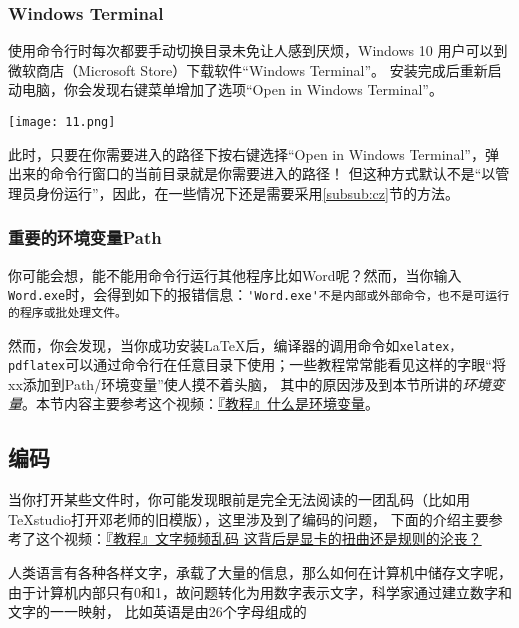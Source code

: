 \subsubsection{Windows Terminal}


使用命令行时每次都要手动切换目录未免让人感到厌烦，Windows 10 用户可以到微软商店（Microsoft Store）下载软件“Windows Terminal”。
安装完成后重新启动电脑，你会发现右键菜单增加了选项“Open in Windows Terminal”。

\begin{center}
  \texttt{[image: 11.png]}
\end{center}
此时，只要在你需要进入的路径下按右键选择“Open in Windows Terminal”，弹出来的命令行窗口的当前目录就是你需要进入的路径！
但这种方式默认不是“以管理员身份运行”，因此，在一些情况下还是需要采用\ref{subsub:cz}节的方法。



\subsubsection{重要的环境变量Path}


你可能会想，能不能用命令行运行其他程序比如Word呢？然而，当你输入\verb"Word.exe"时，会得到如下的报错信息：\verb"'Word.exe'不是内部或外部命令，也不是可运行的程序或批处理文件。"

然而，你会发现，当你成功安装\LaTeX{}后，编译器的调用命令如\verb"xelatex，pdflatex"可以通过命令行在任意目录下使用；一些教程常常能看见这样的字眼“将xx添加到Path/环境变量”使人摸不着头脑，
其中的原因涉及到本节所讲的\emph{环境变量}。本节内容主要参考这个视频：\href{https://www.bilibili.com/video/BV1w741147G9?from=search&seid=9151606959931684460&spm_id_from=333.337.0.0}{『教程』什么是环境变量}。



\subsection{编码}


当你打开某些文件时，你可能发现眼前是完全无法阅读的一团乱码（比如用TeXstudio打开邓老师的旧模版），这里涉及到了编码的问题，
下面的介绍主要参考了这个视频：\href{https://www.bilibili.com/video/BV1ai4y1x7Uz?spm_id_from=333.999.0.0}{『教程』文字频频乱码 这背后是显卡的扭曲还是规则的沦丧？}

人类语言有各种各样文字，承载了大量的信息，那么如何在计算机中储存文字呢，由于计算机内部只有0和1，故问题转化为用数字表示文字，科学家通过建立数字和文字的一一映射，
比如英语是由26个字母组成的




